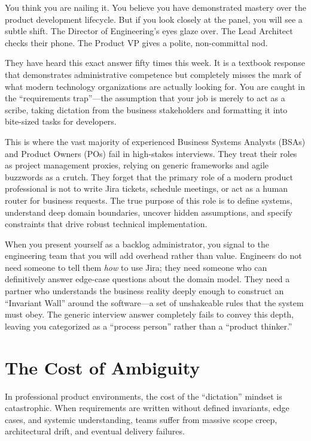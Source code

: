 \documentclass[
  11pt,
  openany,
  oneside]{book}
\begin{document}
You think you are nailing it. You believe you have demonstrated mastery
over the product development lifecycle. But if you look closely at the
panel, you will see a subtle shift. The Director of Engineering's eyes
glaze over. The Lead Architect checks their phone. The Product VP gives
a polite, non-committal nod.

They have heard this exact answer fifty times this week. It is a
textbook response that demonstrates administrative competence but
completely misses the mark of what modern technology organizations are
actually looking for. You are caught in the ``requirements trap''---the
assumption that your job is merely to act as a scribe, taking dictation
from the business stakeholders and formatting it into bite-sized tasks
for developers.

This is where the vast majority of experienced Business Systems Analysts
(BSAs) and Product Owners (POs) fail in high-stakes interviews. They
treat their roles as project management proxies, relying on generic
frameworks and agile buzzwords as a crutch. They forget that the primary
role of a modern product professional is not to write Jira tickets,
schedule meetings, or act as a human router for business requests. The
true purpose of this role is to define systems, understand deep domain
boundaries, uncover hidden assumptions, and specify constraints that
drive robust technical implementation.

When you present yourself as a backlog administrator, you signal to the
engineering team that you will add overhead rather than value. Engineers
do not need someone to tell them \emph{how} to use Jira; they need
someone who can definitively answer edge-case questions about the domain
model. They need a partner who understands the business reality deeply
enough to construct an ``Invariant Wall'' around the software---a set of
unshakeable rules that the system must obey. The generic interview
answer completely fails to convey this depth, leaving you categorized as
a ``process person'' rather than a ``product thinker.''

\section{The Cost of Ambiguity}\label{the-cost-of-ambiguity}

In professional product environments, the cost of the ``dictation''
mindset is catastrophic. When requirements are written without defined
invariants, edge cases, and systemic understanding, teams suffer from
massive scope creep, architectural drift, and eventual delivery
failures.
\end{document}
